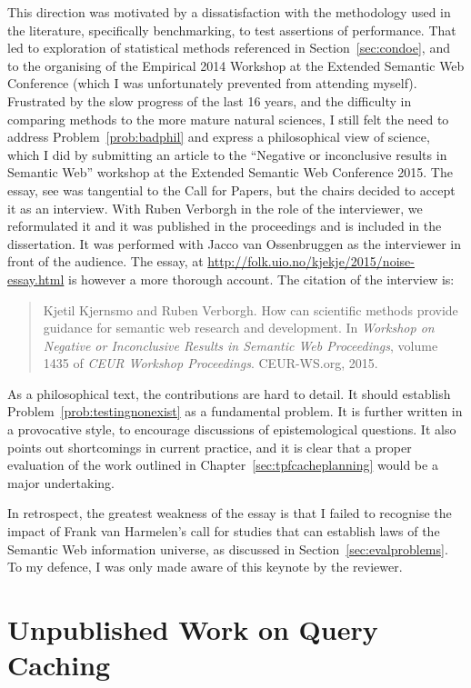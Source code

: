 This direction was motivated by a dissatisfaction with the methodology
used in the literature, specifically benchmarking, to test assertions
of performance. That led to exploration of statistical methods referenced
in Section~\ref{sec:condoe}, and to the organising of the Empirical 2014
Workshop at the Extended Semantic Web Conference (which I was
unfortunately prevented from attending myself). Frustrated by
the slow progress of the last 16 years, and the difficulty in comparing
methods to the more mature natural sciences, I still felt the need to
address Problem~\ref{prob:badphil} and express a philosophical view of 
science, which I did by submitting an
article to the ``Negative or inconclusive results in Semantic Web''
workshop at the Extended Semantic Web Conference 2015. The essay, see
\cite{kjernsmo_noise_2015} was tangential to the Call for Papers, but
the chairs decided to accept it as an interview. With Ruben Verborgh
in the role of the interviewer, we reformulated it and it was published in the
proceedings and is included in the dissertation. It was performed with
Jacco van Ossenbruggen as the interviewer in front of the
audience. The essay, at
\url{http://folk.uio.no/kjekje/2015/noise-essay.html} is however a
more thorough account. The citation of the interview is:
\begin{quote}
Kjetil Kjernsmo and Ruben Verborgh.
\newblock How can scientific methods provide guidance for semantic web research
  and development.
\newblock In {\em Workshop on Negative or Inconclusive Results in Semantic Web
  Proceedings}, volume 1435 of {\em {CEUR} Workshop Proceedings}. CEUR-WS.org,
  2015.
\end{quote}


As a philosophical text, the contributions are hard to detail. It
should establish Problem~\ref{prob:testingnonexist} as a fundamental
problem. It is further
written in a provocative style, to encourage discussions of
epistemological questions. It also points out shortcomings in current
practice, and it is clear that a proper evaluation of the work
outlined in Chapter~\ref{sec:tpfcacheplanning} would be a major
undertaking. 

In retrospect, the greatest weakness of the essay is that I failed to
recognise the impact of Frank van Harmelen's call for studies that can
establish laws of the Semantic Web information universe, as discussed
in Section~\ref{sec:evalproblems}. To my defence, I was only made
aware of this keynote by the reviewer.

\section{Unpublished Work on Query Caching}\label{sec:unpublished}

